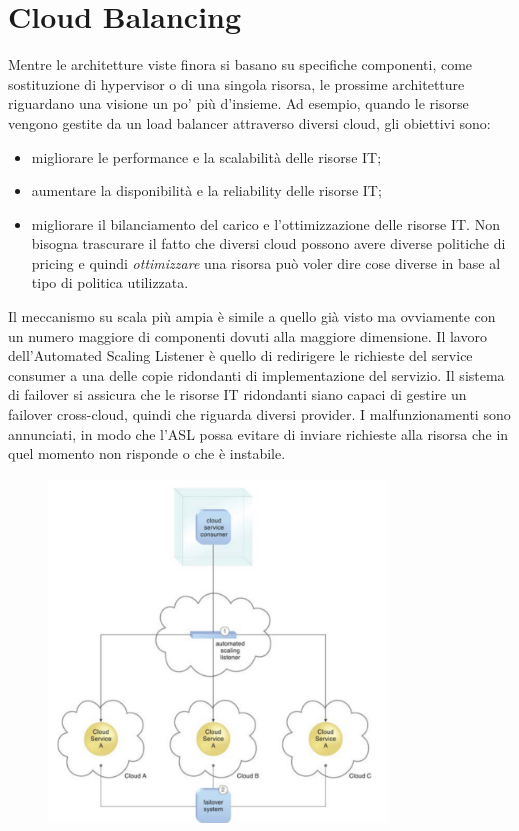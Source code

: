 \section{Cloud Balancing}
Mentre le architetture viste finora si basano su specifiche componenti, come sostituzione di hypervisor o di una singola risorsa, le prossime architetture riguardano una visione un po' più d'insieme. Ad esempio, quando le risorse vengono gestite da un load balancer attraverso diversi cloud, gli obiettivi sono:
\begin{itemize}
    \item migliorare le performance e la scalabilità delle risorse IT;
    \item aumentare la disponibilità e la reliability delle risorse IT;
    \item migliorare il bilanciamento del carico e l'ottimizzazione delle risorse IT. Non bisogna trascurare il fatto che diversi cloud possono avere diverse politiche di pricing e quindi \textit{ottimizzare} una risorsa può voler dire cose diverse in base al tipo di politica utilizzata.
\end{itemize}
Il meccanismo su scala più ampia è simile a quello già visto ma ovviamente con un numero maggiore di componenti dovuti alla maggiore dimensione. Il lavoro dell'Automated Scaling Listener è quello di redirigere le richieste del service consumer a una delle copie ridondanti di implementazione del servizio. Il sistema di failover si assicura che le risorse IT ridondanti siano capaci di gestire un failover cross-cloud, quindi che riguarda diversi provider. I malfunzionamenti sono annunciati, in modo che l'ASL possa evitare di inviare richieste alla risorsa che in quel momento non risponde o che è instabile. 

\begin{figure}[htb!]
    \centering
    \includegraphics[width=9cm]{./Images/cap12/12.9.png}
\end{figure}

